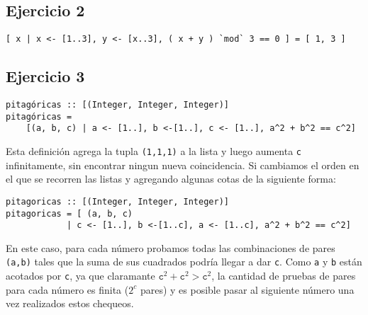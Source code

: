 \documentclass[10pt,a4paper]{article}
\begin{document}
\subsection{Ejercicio 2}
\begin{centrado}
\begin{verbatim}
[ x | x <- [1..3], y <- [x..3], ( x + y ) `mod` 3 == 0 ] = [ 1, 3 ]
\end{verbatim}
\end{centrado}

\newpage
\subsection{Ejercicio 3}
\begin{centrado}
\begin{verbatim}
pitagóricas :: [(Integer, Integer, Integer)]
pitagóricas = 
    [(a, b, c) | a <- [1..], b <-[1..], c <- [1..], a^2 + b^2 == c^2]
\end{verbatim}
\end{centrado}

Esta definición agrega la tupla \texttt{(1,1,1)} a la lista y luego aumenta \texttt{c} infinitamente, sin encontrar ningun nueva coincidencia. Si cambiamos el orden en el que se recorren las listas y agregando algunas cotas de la siguiente forma:
\begin{centrado}
\begin{verbatim}
pitagoricas :: [(Integer, Integer, Integer)]
pitagoricas = [ (a, b, c)
            | c <- [1..], b <-[1..c], a <- [1..c], a^2 + b^2 == c^2]
\end{verbatim}
\end{centrado}
En este caso, para cada número probamos todas las combinaciones de pares \texttt{(a,b)} tales que la suma de sus cuadrados podría llegar a dar \texttt{c}. Como \texttt{a} y \texttt{b} están acotados por \texttt{c}, ya que claramante $\texttt{c}^2 + \texttt{c}^2 > \texttt{c}^2$, la cantidad de pruebas de pares para cada número es finita ($2^c$ pares) y es posible pasar al siguiente número una vez realizados estos chequeos.
\end{document}

